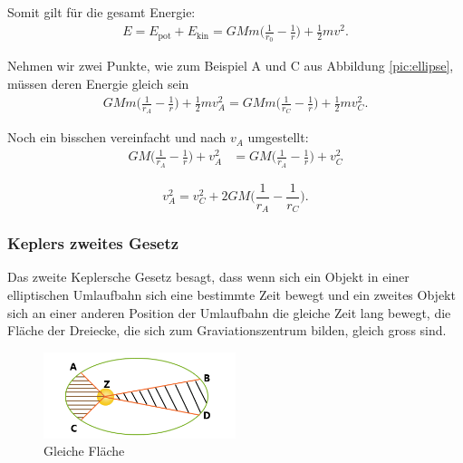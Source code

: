 \begin{refsection}
\noindent{}Somit gilt für die gesamt Energie:
\begin{align*}
E = E_{\text{pot}} + E_{\text{kin}} = GMm \biggr( \frac{1}{r_0} - \frac{1}{r}\biggr) + \frac{1}{2}mv^2.
\end{align*}

\noindent{}Nehmen wir zwei Punkte, wie zum Beispiel A und C aus Abbildung \ref{pic:ellipse}, müssen deren Energie gleich sein
\begin{align*}
GMm \biggr( \frac{1}{r_A} - \frac{1}{r}\biggr) + \frac{1}{2}mv_A^2 = GMm \biggr( \frac{1}{r_C} - \frac{1}{r}\biggr) + \frac{1}{2}mv_C^2.
\end{align*}

\noindent{}Noch ein bisschen vereinfacht und nach $v_A$ umgestellt:
\begin{align*}
GM \biggr( \frac{1}{r_A} - \frac{1}{r}\biggr) + v_A^2 &= GM \biggr( \frac{1}{r_A} - \frac{1}{r}\biggr) + v_C^2
\end{align*}

\begin{equation}
v_A^2 = v_C^2 + 2GM \biggr( \frac{1}{r_A} - \frac{1}{r_C}\biggr).
\label{eq:keplerenergie}
\end{equation}

\subsubsection{Keplers zweites Gesetz}
Das zweite Keplersche Gesetz besagt, dass wenn sich ein Objekt in einer elliptischen Umlaufbahn sich eine bestimmte Zeit bewegt und ein zweites Objekt sich an einer anderen Position der Umlaufbahn die gleiche Zeit lang bewegt, die Fläche der Dreiecke, die sich zum Graviationszentrum bilden, gleich gross sind.
\begin{figure}[h]
\centering
\includegraphics[width=0.5\textwidth]{gps/pictures/keplersec.png}
\caption{Gleiche Fläche}
\end{figure}


\end{refsection}
